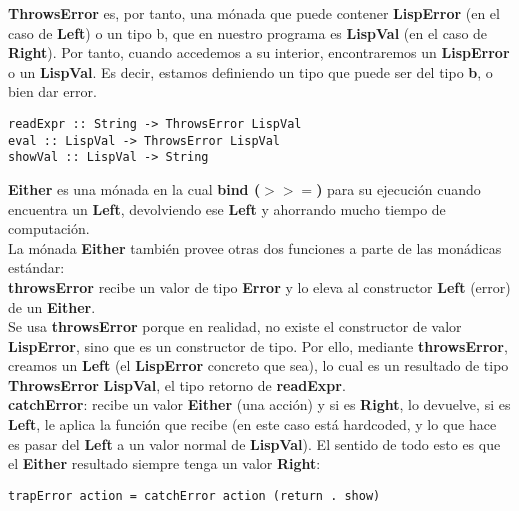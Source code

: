 \textbf{ThrowsError} es, por tanto, una m\'onada que puede contener \textbf{LispError} (en el caso de \textbf{Left}) o un tipo b, que en nuestro programa es \textbf{LispVal} (en el caso de \textbf{Right}). Por tanto, cuando accedemos a su interior, encontraremos un \textbf{LispError} o un \textbf{LispVal}. Es decir, estamos definiendo un tipo que puede ser del tipo \textbf{b}, o bien dar error.\\

\begin{minipage}{\linewidth}
\begin{small}
\begin{lstlisting}[frame=single]
readExpr :: String -> ThrowsError LispVal
eval :: LispVal -> ThrowsError LispVal
showVal :: LispVal -> String
\end{lstlisting}
\end{small}
\end{minipage}

\textbf{Either} es una m\'onada en la cual \textbf{bind ($>>=$)} para su ejecuci\'on cuando encuentra un \textbf{Left}, devolviendo ese \textbf{Left} y ahorrando mucho tiempo de computaci\'on.\\

La m\'onada \textbf{Either} tambi\'en provee otras dos funciones a parte de las mon\'adicas est\'andar:\\

\textbf{throwsError} recibe un valor de tipo \textbf{Error} y lo eleva al constructor \textbf{Left} (error) de un \textbf{Either}.\\

Se usa \textbf{throwsError} porque en realidad, no existe el constructor de valor \textbf{LispError}, sino que es un constructor de tipo. Por ello, mediante \textbf{throwsError}, creamos un \textbf{Left} (el \textbf{LispError} concreto que sea), lo cual es un resultado de tipo \textbf{ThrowsError} \textbf{LispVal}, el tipo retorno de \textbf{readExpr}.\\

\textbf{catchError}: recibe un valor \textbf{Either} (una acci\'on) y si es \textbf{Right}, lo devuelve, si es \textbf{Left}, le aplica la funci\'on que recibe (en este caso est\'a hardcoded, y lo que hace es pasar del \textbf{Left} a un valor normal de \textbf{LispVal}). El sentido de todo esto es que
el \textbf{Either} resultado siempre tenga un valor \textbf{Right}:\\

\begin{minipage}{\linewidth}
\begin{small}
\begin{lstlisting}[frame=single]
trapError action = catchError action (return . show)
\end{lstlisting}
\end{small}
\end{minipage}

